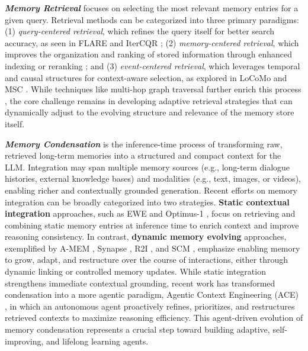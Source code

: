 \documentclass[manuscript,screen]{acmart}
\begin{document}
\textit{\textbf{Memory Retrieval}} focuses on selecting the most relevant memory entries for a given query. Retrieval methods can be categorized into three primary paradigms: (1) \textit{query-centered retrieval}, which refines the query itself for better search accuracy, as seen in FLARE \citep{jiang-etal-2023-active} and IterCQR \citep{jang-etal-2024-itercqr}; (2) \textit{memory-centered retrieval}, which improves the organization and ranking of stored information through enhanced indexing \citep{wu2024longmemeval} or reranking \citep{du2024perltqa}; and (3) \textit{event-centered retrieval}, which leverages temporal and causal structures for context-aware selection, as explored in LoCoMo \citep{maharana2024evaluating} and MSC \citep{xu2021beyond}. While techniques like multi-hop graph traversal further enrich this process \citep{gutierrez2024hipporag}, the core challenge remains in developing adaptive retrieval strategies that can dynamically adjust to the evolving structure and relevance of the memory store itself.

\textit{\textbf{Memory Condensation}} is the inference-time process of transforming raw, retrieved long-term memories into a structured and compact context for the LLM. Integration may span multiple memory sources (e.g., long-term dialogue histories, external knowledge bases) and modalities (e.g., text, images, or videos), enabling richer and contextually grounded generation. Recent efforts on memory integration can be broadly categorized into two strategies. \textbf{Static contextual integration} approaches, such as EWE \citep{chen2024improving} and Optimus-1 \citep{li2024optimus}, focus on retrieving and combining static memory entries at inference time to enrich context and improve reasoning consistency. In contrast, \textbf{dynamic memory evolving} approaches, exemplified by A-MEM \citep{hou2024myagent}, Synapse \citep{zheng2024synapse}, R2I \citep{samsami2024mastering}, and SCM \citep{wang2024enhancing}, emphasize enabling memory to grow, adapt, and restructure over the course of interactions, either through dynamic linking or controlled memory updates. While static integration strengthens immediate contextual grounding, recent work has transformed condensation into a more agentic paradigm, Agentic Context Engineering (ACE) \citep{zhang2025agentic}, in which an autonomous agent proactively refines, prioritizes, and restructures retrieved contexts to maximize reasoning efficiency. This agent-driven evolution of memory condensation represents a crucial step toward building adaptive, self-improving, and lifelong learning agents.
\end{document}
